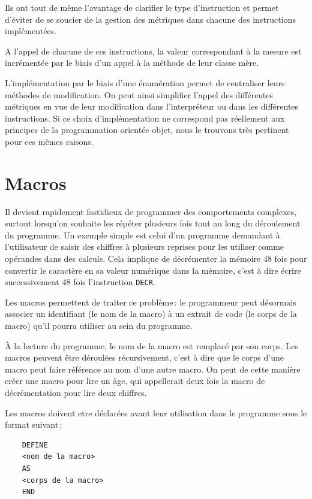 \documentclass[titlepage]{article}
\begin{document}
    Ils ont tout de même l'avantage de clarifier le type d'instruction et permet d'éviter de se soucier de la gestion des métriques dans chacune des instructions implémentées.

    A l'appel de chacune de ces instructions, la valeur correspondant à la mesure est incrémentée par le biais d'un appel à la méthode de leur classe mère.


    L'implémentation par le biais d'une énumération permet de centraliser leurs méthodes de modification. On peut ainsi simplifier l'appel des différentes métriques en vue de leur modification dans l’interpréteur ou dans les différentes instructions. Si ce choix d'implémentation ne correspond pas réellement aux principes de la programmation orientée objet, nous le trouvons très pertinent pour ces mêmes raisons.



\section{Macros}

    Il devient rapidement fastidieux de programmer des comportements complexes, surtout lorsqu'on souhaite les répéter plusieurs fois tout au long du déroulement du programme. Un exemple simple est celui d'un programme demandant à l'utilisateur de saisir des chiffres à plusieurs reprises pour les utiliser comme opérandes dans des calculs. Cela implique de décrémenter la mémoire 48 fois pour convertir le caractère en sa valeur numérique dans la mémoire, c'est à dire écrire successivement 48 fois l'instruction \texttt{DECR}.

    Les macros permettent de traiter ce problème : le programmeur peut désormais associer un identifiant (le nom de la macro) à un extrait de code (le corps de la macro) qu'il pourra utiliser au sein du programme.

    À la lecture du programme, le nom de la macro est remplacé par son corps.
Les macros peuvent être déroulées récursivement, c'est à dire que le corps d'une macro peut faire référence au nom d'une autre macro.
On peut de cette manière créer une macro pour lire un âge, qui appellerait deux fois la macro de décrémentation pour lire deux chiffres.


        Les macros doivent etre déclarées avant leur utilisation dans le programme sous le format suivant :

\begin{verbatim}
    DEFINE
    <nom de la macro>
    AS
    <corps de la macro>
    END
\end{verbatim}
\end{document}
